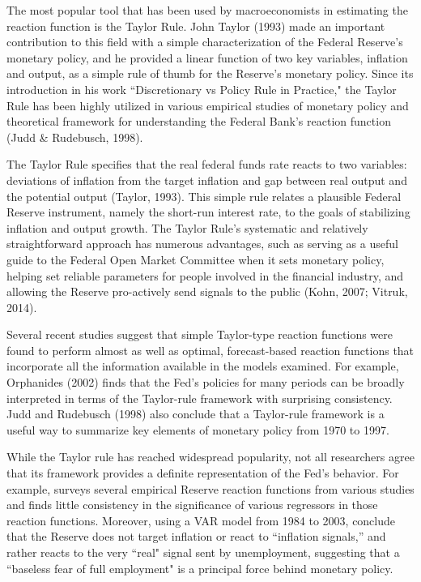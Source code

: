 \documentclass[notitlepage,12pt]{article}
\begin{document}
The most popular tool that has been used by macroeconomists in estimating the reaction function is the Taylor Rule. John Taylor (1993) made an important contribution to this field with a simple characterization of the Federal Reserve's monetary policy, and he provided a linear function of two key variables, inflation and output, as a simple rule of thumb for the Reserve's monetary policy. Since its introduction in his work ``Discretionary vs Policy Rule in Practice," the Taylor Rule has been highly utilized in various empirical studies of monetary policy and theoretical framework for understanding the Federal Bank's reaction function (Judd \& Rudebusch, 1998).

The Taylor Rule specifies that the real federal funds rate reacts to two variables: deviations of inflation from the target inflation and gap between real output and the potential output (Taylor, 1993). This simple rule relates a plausible Federal Reserve instrument, namely the short-run interest rate, to the goals of stabilizing inflation and output growth. The Taylor Rule's systematic and relatively straightforward approach has numerous advantages, such as serving as a useful guide to the Federal Open Market Committee when it sets monetary policy, helping set reliable parameters for people involved in the financial industry, and allowing the Reserve pro-actively send signals to the public (Kohn, 2007; Vitruk, 2014). \nocite{kohn2007john} \nocite{vitruk2014development} 

Several recent studies suggest that simple Taylor-type reaction functions were found to perform almost as well as optimal, forecast-based reaction functions that incorporate all the information available in the models examined. For example, Orphanides (2002) finds that the Fed's policies for many periods can be broadly interpreted in terms of the Taylor-rule framework with surprising consistency. Judd and Rudebusch (1998) also conclude that a Taylor-rule framework is a useful way to summarize key elements of monetary policy from 1970 to 1997. 

While the Taylor rule has reached widespread popularity, not all researchers agree that its framework provides a definite representation of the Fed's behavior. For example, \cite{khoury1990federal} surveys several empirical Reserve reaction functions from various studies and finds little consistency in the significance of various regressors in those reaction functions. Moreover, using a VAR model from 1984 to 2003, \cite{galbraith2007fed} conclude that the Reserve does not target inflation or react to ``inflation signals,” and rather reacts to the very ``real" signal sent by unemployment, suggesting that a ``baseless fear of full employment" is a principal force behind monetary policy. 
\end{document}
